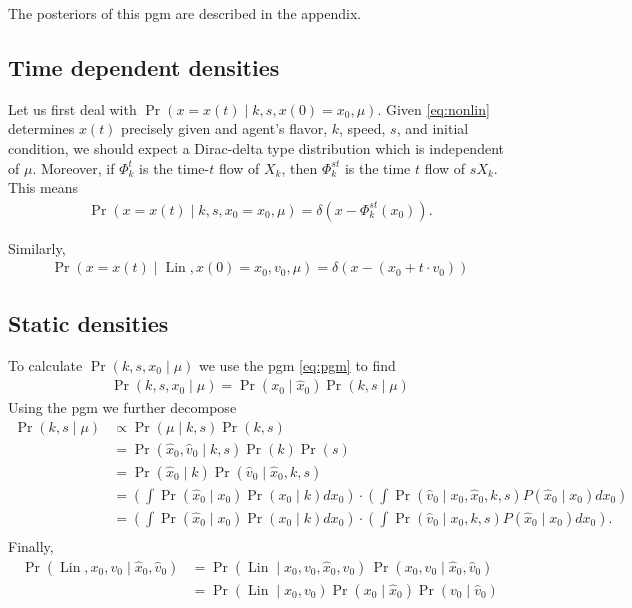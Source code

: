 \documentclass[12pt]{amsart}
\DeclareMathOperator{\Lin}{Lin}
\begin{document}
The posteriors of this pgm are described in the appendix.

\subsection{Time dependent densities}
Let us first deal with $\Pr( x = x(t) \mid k,s, x(0) = x_0, \mu )$.
Given \eqref{eq:nonlin} determines $x(t)$ precisely given and agent's flavor, $k$, speed, $s$, and initial condition,
we should expect a Dirac-delta type distribution which is independent of $\mu$.
Moreover, if $\Phi_k^t$ is the time-$t$ flow of $X_k$, then $\Phi_k^{st}$ is the time $t$ flow of $s X_k$. 
This means
\begin{align*}
	\Pr( x  = x(t) \mid k,s, x_0 = x_0 , \mu ) = \delta( x - \Phi_k^{st}( x_0) ).
\end{align*}

Similarly,
\begin{align*}
	\Pr( x = x(t) \mid \Lin, x(0) = x_0, v_0 , \mu ) = \delta \left( x - (x_0 + t \cdot v_0 ) \right)
\end{align*}


\subsection{Static densities}
To calculate $\Pr(k,s,x_0 \mid \mu )$ we use the pgm \eqref{eq:pgm} to find
\begin{align*}
	\Pr( k,s,x_0 \mid \mu ) = \Pr( x_0 \mid \hat{x}_0 ) \Pr( k ,s \mid \mu )
\end{align*}
Using the pgm we further decompose
\begin{align*}
	\Pr( k,s \mid \mu ) &\propto \Pr( \mu \mid k,s ) \Pr( k,s) \\
		&= \Pr( \hat{x}_0, \hat{v}_0 \mid k,s ) \Pr(k) \Pr(s) \\
		&= \Pr( \hat{x}_0 \mid k ) \Pr( \hat{v}_0 \mid \hat{x}_0 , k , s ) \\
		&= \left( \int \Pr( \hat{x}_0 \mid x_0) \Pr( x_0 \mid k ) dx_0 \right) \cdot \left(  \int \Pr( \hat{v}_0 \mid x_0 , \hat{x}_0,  k , s ) P( \hat{x}_0 \mid x_0) dx_0 \right) \\
		&=  \left( \int \Pr( \hat{x}_0 \mid x_0) \Pr( x_0 \mid k ) dx_0 \right) \cdot \left(  \int \Pr( \hat{v}_0 \mid x_0 , k , s ) P( \hat{x}_0 \mid x_0) dx_0 \right). \\
\end{align*}
Finally,
\begin{align*}
	\Pr( \Lin , x_0, v_0 \mid \hat{x}_0, \hat{v}_0 ) &= \Pr( \Lin \mid x_0, v_0, \hat{x}_0, \hat{v}_0) \, \Pr( x_0, v_0 \mid \hat{x}_0, \hat{v}_0 ) \\
	&= \Pr(\Lin \mid x_0, v_0) \Pr(x_0 \mid \hat{x}_0) \Pr( v_0 \mid \hat{v}_0 )
\end{align*}
\end{document}
